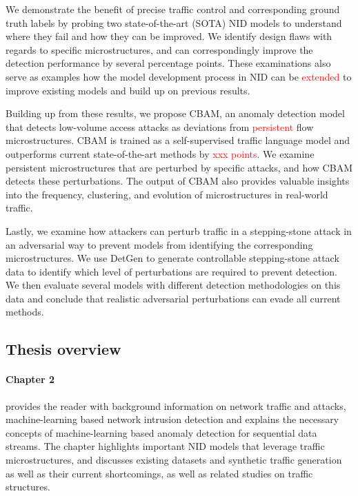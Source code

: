 We demonstrate the benefit of precise traffic control and corresponding ground truth labels by probing two state-of-the-art (SOTA) NID models to understand where they fail and how they can be improved. We identify design flaws with regards to specific microstructures, and can correspondingly improve the detection performance by several percentage points. These examinations also serve as examples how the model development process in NID can be \textcolor{red}{extended} to improve existing models and build up on previous results.

Building up from these results, we propose CBAM, an anomaly detection model that detects low-volume access attacks as deviations from \textcolor{red}{persistent} flow microstructures. CBAM is trained as a self-supervised traffic language model and outperforms current state-of-the-art methods by \textcolor{red}{xxx points}. We examine persistent microstructures that are perturbed by specific attacks, and how CBAM detects these perturbations. The output of CBAM also provides valuable insights into the frequency, clustering, and evolution of microstructures in real-world traffic.

Lastly, we examine how attackers can perturb traffic in a stepping-stone attack in an adversarial way to prevent models from identifying the corresponding microstructures. We use DetGen to generate controllable stepping-stone attack data to identify which level of perturbations are required to prevent detection. We then evaluate several models with different detection methodologies on this data and conclude that realistic adversarial perturbations can evade all current methods.

\subsection{Thesis overview}

\paragraph{Chapter 2} provides the reader with background information on network traffic and attacks, machine-learning based network intrusion detection and explains the necessary concepts of machine-learning based anomaly detection for sequential data streams. The chapter highlights important NID models that leverage traffic microstructures, and discusses existing datasets and synthetic traffic generation as well as their current shortcomings, as well as related studies on traffic structures.

